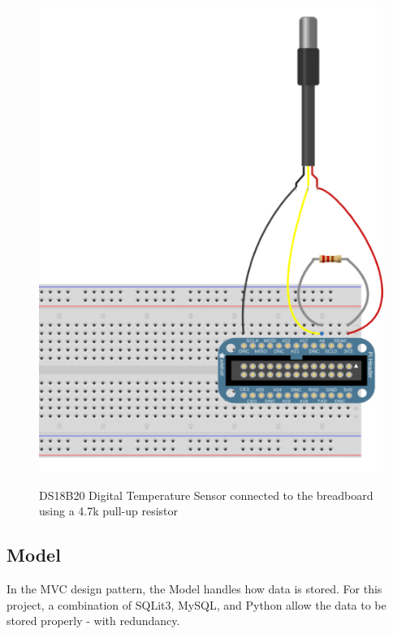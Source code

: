 \documentclass{article}
\begin{document}
				\begin{figure}[H]
  					\begin{center}	
						\includegraphics[scale=.8]{breadboard.png}\\
					\end{center}
  						\captionsetup{labelformat=empty}
  						\caption{DS18B20 Digital Temperature Sensor connected to the breadboard using a  4.7k pull-up resistor}
  				\end{figure}	
						
  	
  	\newpage	
  		\subsection{Model}		
  			In the MVC design pattern, the Model handles how data is stored. For this project, a combination of SQLit3, MySQL,
  			and Python allow the data to be stored properly - with redundancy.
\end{document}
